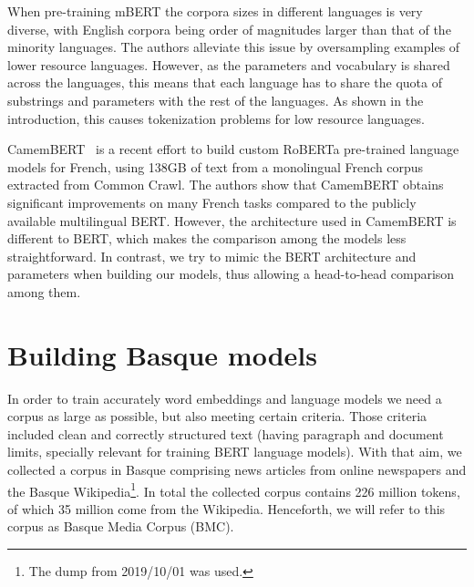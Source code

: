 \documentclass[10pt, a4paper]{article}
\begin{document}
When pre-training mBERT the corpora sizes in different languages is very diverse, with English corpora being order of magnitudes larger than that of the minority languages. The authors alleviate this issue by oversampling examples of lower resource languages. However, as the parameters and vocabulary is shared across the languages, this means that each language has to share the quota of substrings and parameters with the rest of the languages. As shown in the introduction, this causes tokenization problems for low resource languages.

CamemBERT~\cite{martin2019camembert} is a recent effort to build custom RoBERTa \cite{liu2019roberta} pre-trained language models for French, using 138GB of text from a monolingual French corpus extracted from Common Crawl. The authors show that CamemBERT obtains significant improvements on many French tasks compared to the publicly available multilingual BERT. However, the architecture used in CamemBERT is different to BERT, which makes the comparison among the models less straightforward. In contrast, we try to mimic the BERT architecture and parameters when building our models, thus allowing a head-to-head comparison among them.

\section{Building Basque models}\label{sec:build-basq-models}


In order to train accurately word embeddings and language models we need a corpus as large as possible, but also meeting certain criteria. Those criteria included clean and correctly structured text (having paragraph and document limits, specially relevant for training BERT language models). With that aim, we collected a corpus in Basque comprising news articles from online newspapers and the Basque Wikipedia\footnote{The dump from 2019/10/01 was used.}. In total the collected corpus contains 226 million tokens, of which 35 million come from the Wikipedia. Henceforth, we will refer to this corpus as Basque Media Corpus (BMC).


\end{document}
